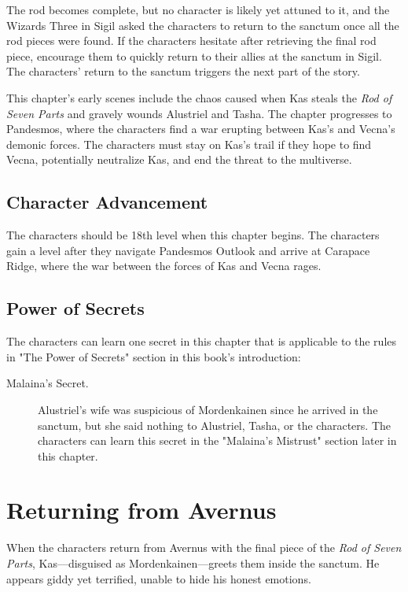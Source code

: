 \documentclass[10pt,a4paper,twoside,bg=print,twocolumn,openany,nodeprecatedcode]{dndbook}
\begin{document}
The rod becomes complete, but no character is likely yet attuned to it, and the Wizards Three in Sigil asked the characters to return to the sanctum once all the rod pieces were found. If the characters hesitate after retrieving the final rod piece, encourage them to quickly return to their allies at the sanctum in Sigil. The characters' return to the sanctum triggers the next part of the story.

This chapter's early scenes include the chaos caused when Kas steals the \textit{Rod of Seven Parts} and gravely wounds Alustriel and Tasha. The chapter progresses to Pandesmos, where the characters find a war erupting between Kas's and Vecna's demonic forces. The characters must stay on Kas's trail if they hope to find Vecna, potentially neutralize Kas, and end the threat to the multiverse.

\subsection{Character Advancement}
The characters should be 18th level when this chapter begins. The characters gain a level after they navigate Pandesmos Outlook and arrive at Carapace Ridge, where the war between the forces of Kas and Vecna rages.

\subsection{Power of Secrets}
The characters can learn one secret in this chapter that is applicable to the rules in "The Power of Secrets" section in this book's introduction:


\begin{description}
\item[Malaina's Secret.]
Alustriel's wife was suspicious of Mordenkainen since he arrived in the sanctum, but she said nothing to Alustriel, Tasha, or the characters. The characters can learn this secret in the "Malaina's Mistrust" section later in this chapter.
\end{description}

\section{Returning from Avernus}
When the characters return from Avernus with the final piece of the \textit{Rod of Seven Parts}, Kas—disguised as Mordenkainen—greets them inside the sanctum. He appears giddy yet terrified, unable to hide his honest emotions.
\end{document}
